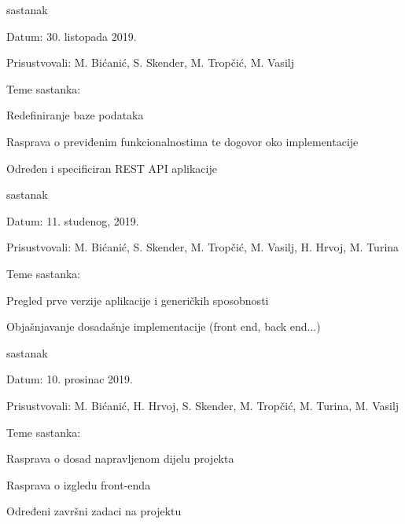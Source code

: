 \begin{packed_enum}
			\item  sastanak
			\item[] \begin{packed_item}
				\item Datum: 30. listopada 2019.
				\item Prisustvovali: M. Bićanić, S. Skender, M. Tropčić, M. Vasilj
				\item Teme sastanka:
				\begin{packed_item}
					\item  Redefiniranje baze podataka
					\item  Rasprava o previđenim funkcionalnostima te dogovor oko implementacije
					\item Određen i specificiran REST API aplikacije
				\end{packed_item}
			\end{packed_item}
		
			\item  sastanak
			
			\item[] \begin{packed_item}
				\item Datum: 11. studenog, 2019.
				\item Prisustvovali: M. Bićanić, S. Skender, M. Tropčić, M. Vasilj, H. Hrvoj, M. Turina
				\item Teme sastanka:
				\begin{packed_item}
					\item  Pregled prve verzije aplikacije i generičkih sposobnosti
					\item  Objašnjavanje dosadašnje implementacije (front end, back end...)
				\end{packed_item}
			\end{packed_item}
			
			\item  sastanak
		
			\item[] \begin{packed_item}
				\item Datum: 10. prosinac 2019.
				\item Prisustvovali: M. Bićanić, H. Hrvoj, S. Skender, M. Tropčić, M. Turina, M. Vasilj 
				\item Teme sastanka:
				\begin{packed_item}
					\item  Rasprava o dosad napravljenom dijelu projekta
					\item  Rasprava o izgledu front-enda
					\item Određeni završni zadaci na projektu
				\end{packed_item}
			\end{packed_item}
		

\end{packed_enum}
